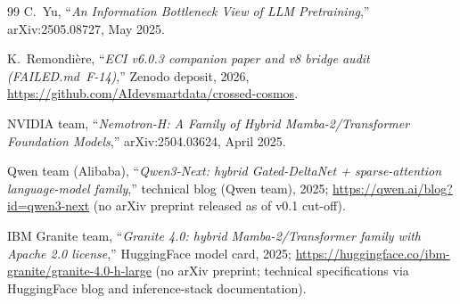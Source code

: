 \documentclass[10pt,a4paper]{article}
\theoremstyle{remark}
\begin{document}
\begin{thebibliography}{99}
C.~Yu,
``\emph{An Information Bottleneck View of LLM Pretraining},''
arXiv:2505.08727, May 2025.

K.~Remondi\`ere,
``\emph{ECI v6.0.3 companion paper and v8 bridge audit
(FAILED.md~F-14)},''
Zenodo deposit, 2026,
\url{https://github.com/AIdevsmartdata/crossed-cosmos}.

NVIDIA team,
``\emph{Nemotron-H: A Family of Hybrid Mamba-2/Transformer Foundation
Models},''
arXiv:2504.03624, April 2025.

Qwen team (Alibaba),
``\emph{Qwen3-Next: hybrid Gated-DeltaNet + sparse-attention
language-model family},''
technical blog (Qwen team), 2025;
\url{https://qwen.ai/blog?id=qwen3-next}
(no arXiv preprint released as of v0.1 cut-off).

IBM Granite team,
``\emph{Granite 4.0: hybrid Mamba-2/Transformer family with Apache 2.0 license},''
HuggingFace model card, 2025;
\url{https://huggingface.co/ibm-granite/granite-4.0-h-large}
(no arXiv preprint; technical specifications via HuggingFace blog and
inference-stack documentation).

\end{thebibliography}
\end{document}
